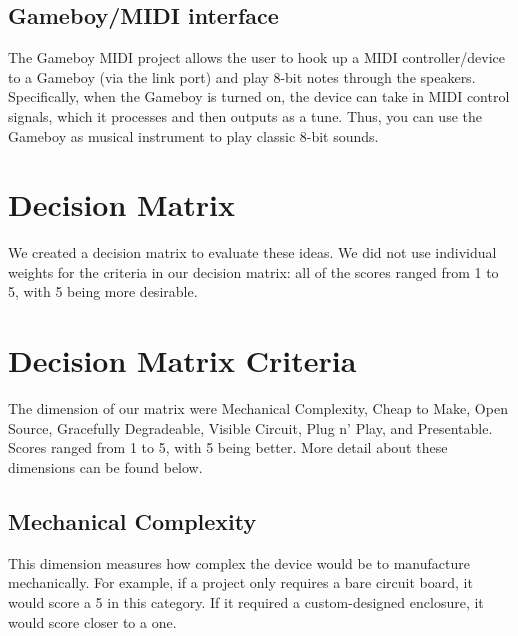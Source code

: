 \documentclass{article}
\begin{document}
\subsection{Gameboy/MIDI interface}

The Gameboy MIDI project allows the user to hook up a MIDI
controller/device to a Gameboy (via the link port) and play 8-bit
notes through the speakers. Specifically, when the Gameboy is turned
on, the device can take in MIDI control signals, which it processes
and then outputs as a tune. Thus, you can use the Gameboy as musical
instrument to play classic 8-bit sounds.

\newpage

\section{Decision Matrix}
We created a decision matrix to evaluate these ideas. We did not use
individual weights for the criteria in our decision matrix: all of the
scores ranged from 1 to 5, with 5 being more desirable.


\section{Decision Matrix Criteria}
The dimension of
our matrix were Mechanical Complexity, Cheap to Make, Open Source,
Gracefully Degradeable, Visible Circuit, Plug n' Play, and
Presentable. Scores ranged from 1 to 5, with 5 being better. More
detail about these dimensions can be found below.
\subsection {Mechanical Complexity}
This dimension measures how complex the device would be to manufacture
mechanically. For example, if a project only requires a bare circuit
board, it would score a 5 in this category. If it required a
custom-designed enclosure, it would score closer to a one. 
\end{document}
